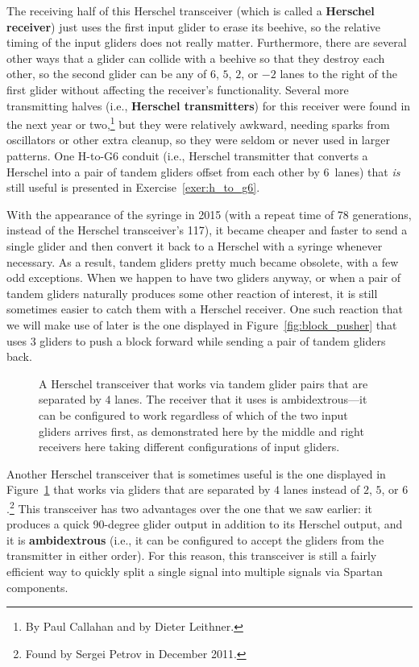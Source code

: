The receiving half of this Herschel transceiver (which is called a \textbf{Herschel receiver}) just uses the first input glider to erase its beehive, so the relative timing of the input gliders does not really matter. Furthermore, there are several other ways that a glider can collide with a beehive so that they destroy each other, so the second glider can be any of $6$, $5$, $2$, or $-2$ lanes to the right of the first glider without affecting the receiver's functionality. Several more transmitting halves (i.e., \textbf{Herschel transmitters}) for this receiver were found in the next year or two,\footnote{By Paul Callahan and by Dieter Leithner.} but they were relatively awkward, needing sparks from oscillators or other extra cleanup, so they were seldom or never used in larger patterns. One H-to-G6 conduit (i.e., Herschel transmitter that converts a Herschel into a pair of tandem gliders offset from each other by $6$~lanes) that \emph{is} still useful is presented in Exercise~\ref{exer:h_to_g6}.

With the appearance of the syringe in 2015 (with a repeat time of 78 generations, instead of the Herschel transceiver's 117), it became cheaper and faster to send a single glider and then convert it back to a Herschel with a syringe whenever necessary. As a result, tandem gliders pretty much became obsolete, with a few odd exceptions. When we happen to have two gliders anyway, or when a pair of tandem gliders naturally produces some other reaction of interest, it is still sometimes easier to catch them with a Herschel receiver. One such reaction that we will make use of later is the one displayed in Figure~\ref{fig:block_pusher} that uses $3$ gliders to push a block forward while sending a pair of tandem gliders back.

\begin{figure}[!htb]
	\centering
	\caption{A Herschel transceiver that works via tandem glider pairs that are separated by $4$ lanes. The receiver that it uses is ambidextrous---it can be configured to work regardless of which of the two input gliders arrives first, as demonstrated here by the middle and right receivers here taking different configurations of input gliders.}
	\label{fig:herschel_transceiver_4}
\end{figure}

Another Herschel transceiver that is sometimes useful is the one displayed in Figure~\ref{fig:herschel_transceiver_4} that works via gliders that are separated by $4$ lanes instead of $2$, $5$, or $6$.\footnote{Found by Sergei Petrov in December 2011.} This transceiver has two advantages over the one that we saw earlier: it produces a quick 90-degree glider output in addition to its Herschel output, and it is \textbf{ambidextrous} (i.e., it can be configured to accept the gliders from the transmitter in either order). For this reason, this transceiver is still a fairly efficient way to quickly split a single signal into multiple signals via Spartan components.

